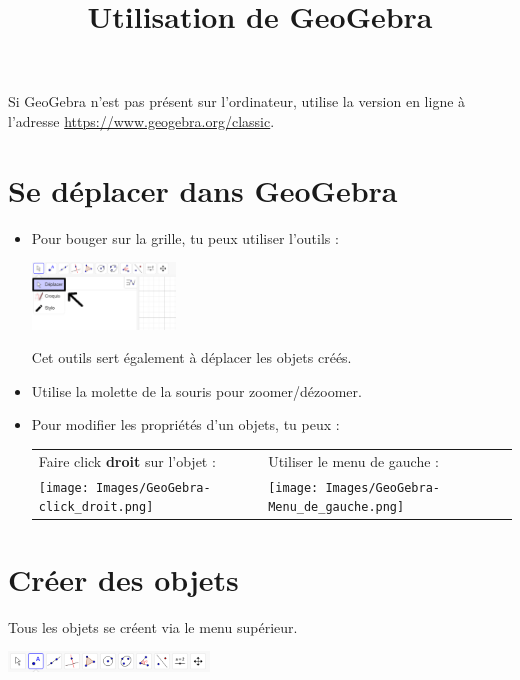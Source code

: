 \documentclass[a4paper,landscape,twocolumn,11pt,gray]{article}
\title{Utilisation de GeoGebra}
\date{}
\author{}
\begin{document}
\maketitle

\begin{attention}[frametitle={⚠}]
	Si GeoGebra n'est pas présent sur l'ordinateur, utilise la version en ligne à l'adresse \url{https://www.geogebra.org/classic}.
\end{attention}

\section{Se déplacer dans GeoGebra}

\begin{itemize}
	\item Pour bouger sur la grille, tu peux utiliser l'outils  :

	      \includegraphics[width=0.3\textwidth,frame]{Images/GeoGebra-Déplacer.png}

	      Cet outils sert également à déplacer les objets créés.
	\item Utilise la molette de la souris pour zoomer/dézoomer.
	\item Pour modifier les propriétés d'un objets, tu peux :

	      \begin{tabular}{p{}|p{}}
		      Faire click \textbf{droit} sur l'objet :                                 & Utiliser le menu de gauche :                                              \\
		      \texttt{[image: Images/GeoGebra-click\_droit.png]} & \texttt{[image: Images/GeoGebra-Menu\_de\_gauche.png]}
	      \end{tabular}
\end{itemize}

\section{Créer des objets}

Tous les objets se créent via le menu supérieur.

\includegraphics[width=0.4\textwidth,frame]{Images/GeoGebra-Menu_supérieur.png}
\end{document}
